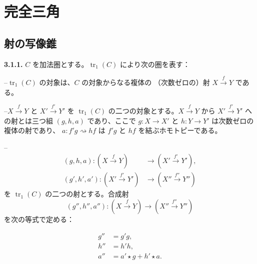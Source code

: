 \clearpage
{}%
\section{完全三角}

\subsection{射の写像錐}

\noindent\textbf{3.1.1.}\quad
{}
$C$ を加法圏とする。$\operatorname{tr}_1(C)$ により次の圏を表す：

\noindent--\quad $\operatorname{tr}_1(C)$ の対象は、$C$ の対象からなる複体の
（次数ゼロの）射 $X\xrightarrow{f}Y$ である。

\noindent--\quad $X\xrightarrow{f}Y$ と $X'\xrightarrow{f'}Y'$ を
$\operatorname{tr}_1(C)$ の二つの対象とする。$X\xrightarrow{f}Y$ から
$X'\xrightarrow{f'}Y'$ への射とは三つ組 $(g,h,a)$ であり、ここで
$g\colon X\longrightarrow X'$ と $h\colon Y\longrightarrow Y'$ は次数ゼロの
複体の射であり、
$a\colon f'g\rightsquigarrow hf$ は $f'g$ と $hf$ を結ぶホモトピーである。

\noindent--\quad
\begin{equation*}
  \begin{aligned}
    (g,h,a)\colon (X\xrightarrow{f}Y)
      &\longrightarrow (X'\xrightarrow{f'}Y'),\\
    (g',h',a')\colon (X'\xrightarrow{f'}Y')
      &\longrightarrow (X''\xrightarrow{f''}Y'')
  \end{aligned}
\end{equation*}
を $\operatorname{tr}_1(C)$ の二つの射とする。合成射
\begin{equation*}
  (g'',h'',a'')\colon
  (X\xrightarrow{f}Y)\longrightarrow(X''\xrightarrow{f''}Y'')
\end{equation*}
を次の等式で定める：

\begin{equation}
  \begin{aligned}
    g''&=g'g,\\
    h''&=h'h,\\
    a''&=a'\star g+h'\star a.
  \end{aligned}
  \tag{3.1.1.1}
\end{equation}

